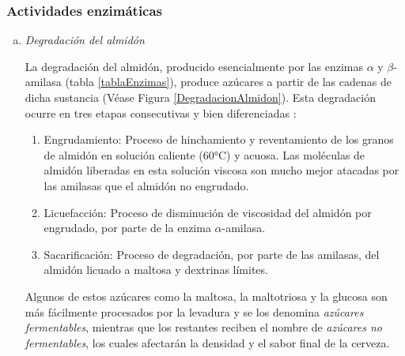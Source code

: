             \subsubsection{Actividades enzimáticas}
                \begin{enumerate}[a)]
                    \item \textit{Degradación del almidón}
                        \par La degradación del almidón, producido esencialmente por las enzimas $\alpha$ y $\beta$-amilasa (tabla \ref{tablaEnzimas}), produce azúcares a partir de las cadenas de dicha sustancia (Véase Figura \ref{DegradacionAlmidon}). Esta degradación ocurre en tres etapas consecutivas y bien diferenciadas \cite{Kunze}:
                        
                        \begin{enumerate}[1.]
                            \item Engrudamiento: Proceso de hinchamiento y reventamiento de los granos de almidón en solución caliente (60°C) y acuosa. Las moléculas de almidón liberadas en esta solución viscosa son mucho mejor atacadas por las amilasas que el almidón no engrudado.
                            
                            \item Licuefacción: Proceso de disminución de viscosidad del almidón por engrudado, por parte de la enzima $\alpha$-amilasa.
                            
                            \item Sacarificación: Proceso de degradación, por parte de las amilasas, del almidón licuado a maltosa y dextrinas límites.
                        \end{enumerate}
                        
                        \par Algunos de estos azúcares como la maltosa, la maltotriosa y la glucosa son más fácilmente procesados por la levadura y se los denomina \textit{azúcares fermentables}, mientras que los restantes reciben el nombre de \textit{azúcares no fermentables}, los cuales afectarán la densidad y el sabor final de la cerveza.
                        

\end{enumerate}
